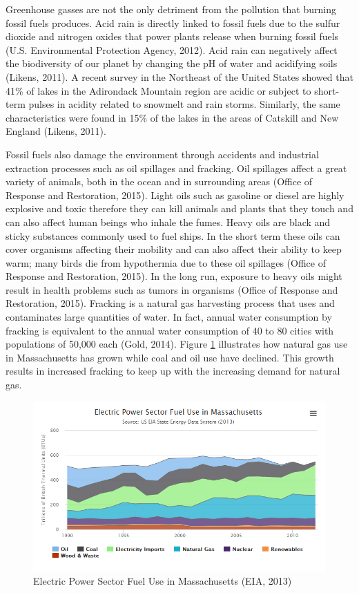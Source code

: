   \par Greenhouse gasses are not the only detriment from the pollution that burning fossil fuels produces. Acid rain is directly linked to fossil fuels due to the sulfur dioxide and nitrogen oxides that power plants release when burning fossil fuels (U.S. Environmental Protection Agency, 2012). Acid rain can negatively affect the biodiversity of our planet by changing the pH of water and acidifying soils (Likens, 2011). A recent survey in the Northeast of the United States showed that 41\% of lakes in the Adirondack Mountain region are acidic or subject to short-term pulses in acidity related to snowmelt and rain storms. Similarly, the same characteristics were found in 15\% of the lakes in the areas of Catskill and New England (Likens, 2011).
  \par Fossil fuels also damage the environment through accidents and industrial extraction processes such as oil spillages and fracking. Oil spillages affect a great variety of animals, both in the ocean and in surrounding areas (Office of Response and Restoration, 2015). Light oils such as gasoline or diesel are highly explosive and toxic therefore they can kill animals and plants that they touch and can also affect human beings who inhale the fumes. Heavy oils are black and sticky substances commonly used to fuel ships. In the short term these oils can cover organisms affecting their mobility and can also affect their ability to keep warm; many birds die from hypothermia due to these oil spillages (Office of Response and Restoration, 2015). In the long run, exposure to heavy oils might result in health problems such as tumors in organisms (Office of Response and Restoration, 2015). Fracking is a natural gas harvesting process that uses and contaminates large quantities of water. In fact, annual water consumption by fracking is equivalent to the annual water consumption of 40 to 80 cities with populations of 50,000 each (Gold, 2014). Figure \ref{fig:power} illustrates how natural gas use in Massachusetts has grown while coal and oil use have declined. This growth results in increased fracking to keep up with the increasing demand for natural gas.
  \begin{figure}[h]
    \centering
      \includegraphics[width=\textwidth]{images/02-ElectricPowerSectorFuelUseinMassachusetts}
    \caption{Electric Power Sector Fuel Use in Massachusetts (EIA, 2013)}
    \label{fig:power}
  \end{figure}
